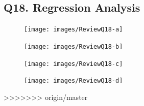 \documentclass[a4paper,12pt]{article}
\begin{document}
\subsection*{Q18. Regression Analysis}
\begin{figure}[h!]
\centering
\texttt{[image: images/ReviewQ18-a]}
\end{figure}
\begin{figure}[h!]
	\centering
	\texttt{[image: images/ReviewQ18-b]}
\end{figure}
\newpage
\begin{figure}[h!]
	\centering
	\texttt{[image: images/ReviewQ18-c]}
\end{figure}
\begin{figure}[h!]
	\centering
	\texttt{[image: images/ReviewQ18-d]}
\end{figure}


>>>>>>> origin/master
\end{document}
